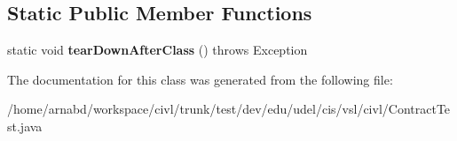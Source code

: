\subsection*{Static Public Member Functions}
\begin{DoxyCompactItemize}
\item 
\hypertarget{classedu_1_1udel_1_1cis_1_1vsl_1_1civl_1_1ContractTest_a386010907c9004db02b9b5fc96884927}{}static void {\bfseries tear\+Down\+After\+Class} ()  throws Exception \label{classedu_1_1udel_1_1cis_1_1vsl_1_1civl_1_1ContractTest_a386010907c9004db02b9b5fc96884927}

\end{DoxyCompactItemize}


The documentation for this class was generated from the following file\+:\begin{DoxyCompactItemize}
\item 
/home/arnabd/workspace/civl/trunk/test/dev/edu/udel/cis/vsl/civl/Contract\+Test.\+java\end{DoxyCompactItemize}
